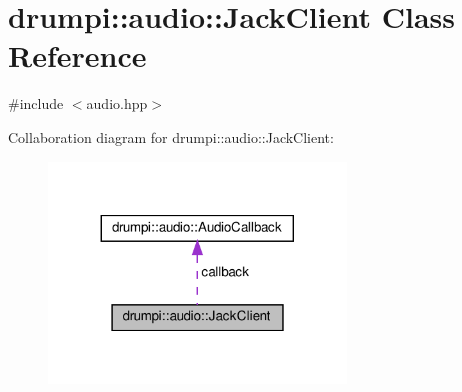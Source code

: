 \hypertarget{classdrumpi_1_1audio_1_1JackClient}{}\section{drumpi\+:\+:audio\+:\+:Jack\+Client Class Reference}
\label{classdrumpi_1_1audio_1_1JackClient}


{\ttfamily \#include $<$audio.\+hpp$>$}



Collaboration diagram for drumpi\+:\+:audio\+:\+:Jack\+Client\+:
\nopagebreak
\begin{figure}[H]
\begin{center}
\leavevmode
\includegraphics[width=224pt]{classdrumpi_1_1audio_1_1JackClient__coll__graph}
\end{center}
\end{figure}
